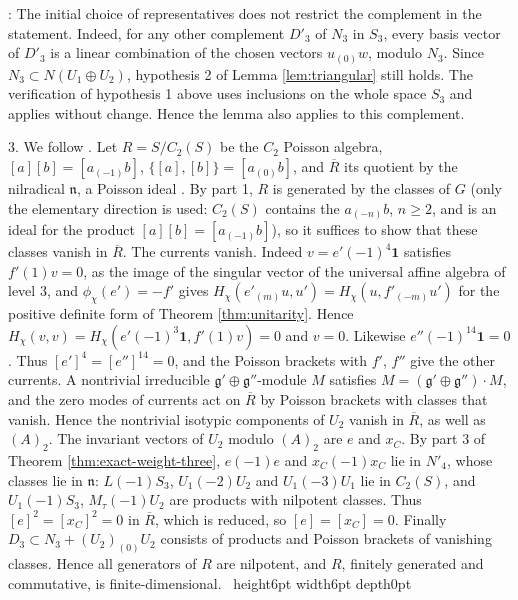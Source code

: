 \documentclass[leqno]{article}
\renewcommand{\geq}{\ensuremath{\geqslant}}
\newcommand{\qed}{\hfill \vrule height6pt  width6pt depth0pt}
\newenvironment{proof}[1][]{\noindent {\it Proof #1} : }{\hbox{~}\qed
\smallskip
}
\numberwithin{equation}{section}
\begin{document}
\begin{proof}
The initial choice of representatives does not restrict the complement in the statement. Indeed, for any other complement $D'_3$ of $N_3$ in $S_3$, every basis vector of $D'_3$ is a linear combination of the chosen vectors $u_{(0)}w$, modulo $N_3$. Since $N_3 \subset N(U_1 \oplus U_2)$, hypothesis 2 of Lemma \ref{lem:triangular} still holds. The verification of hypothesis 1 above uses inclusions on the whole space $S_3$ and applies without change. Hence the lemma also applies to this complement.

3. We follow \cite[Section 5]{Rie26b}. Let $R = S/C_2(S)$ be the $C_2$ Poisson algebra, $[a][b] = [a_{(-1)}b]$, $\{[a],[b]\} = [a_{(0)}b]$, and $\overline R$ its quotient by the nilradical $\mathfrak n$, a Poisson ideal \cite[Corollary 2.4.2]{Ara12}. By part 1, $R$ is generated by the classes of $G$ \cite[Corollary 2.6.2]{Ara12} (only the elementary direction is used: $C_2(S)$ contains the $a_{(-n)}b$, $n \geq 2$, and is an ideal for the product $[a][b] = [a_{(-1)}b]$), so it suffices to show that these classes vanish in $\overline R$. The currents vanish. Indeed $v = e'(-1)^4\mathbf 1$ satisfies $f'(1)v = 0$, as the image of the singular vector of the universal affine algebra of level $3$, and $\phi_\chi(e') = -f'$ gives $H_\chi(e'_{(m)}u,u') = H_\chi(u,f'_{(-m)}u')$ for the positive definite form of Theorem \ref{thm:unitarity}. Hence $H_\chi(v,v) = H_\chi(e'(-1)^3\mathbf 1,f'(1)v) = 0$ and $v = 0$. Likewise $e''(-1)^{14}\mathbf 1 = 0$. Thus $[e']^4 = [e'']^{14} = 0$, and the Poisson brackets with $f'$, $f''$ give the other currents. A nontrivial irreducible $\mathfrak g' \oplus \mathfrak g''$-module $M$ satisfies $M = (\mathfrak g' \oplus \mathfrak g'')\cdot M$, and the zero modes of currents act on $\overline R$ by Poisson brackets with classes that vanish. Hence the nontrivial isotypic components of $U_2$ vanish in $\overline R$, as well as $(A)_2$. The invariant vectors of $U_2$ modulo $(A)_2$ are $e$ and $x_C$. By part 3 of Theorem \ref{thm:exact-weight-three}, $e(-1)e$ and $x_C(-1)x_C$ lie in $N'_4$, whose classes lie in $\mathfrak n$: $L(-1)S_3$, $U_1(-2)U_2$ and $U_1(-3)U_1$ lie in $C_2(S)$, and $U_1(-1)S_3$, $M_\tau(-1)U_2$ are products with nilpotent classes. Thus $[e]^2 = [x_C]^2 = 0$ in $\overline R$, which is reduced, so $[e] = [x_C] = 0$. Finally $D_3 \subset N_3 + (U_2)_{(0)}U_2$ consists of products and Poisson brackets of vanishing classes. Hence all generators of $R$ are nilpotent, and $R$, finitely generated and commutative, is finite-dimensional.
\end{proof}
\end{document}
